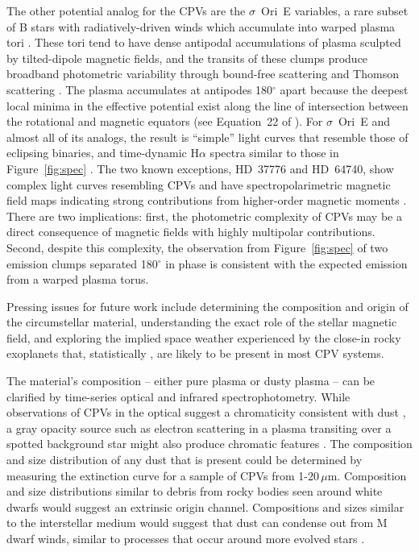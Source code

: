 \documentclass{nature3}
\begin{document}
The other potential analog for the CPVs are the $\sigma$~Ori~E
variables, a rare subset of B stars with radiatively-driven winds
which accumulate into warped plasma tori
\cite{Townsend2005,Townsend2008}.  These tori tend to have dense
antipodal accumulations of plasma sculpted by tilted-dipole magnetic
fields, and the transits of these clumps produce broadband photometric
variability through bound-free scattering \cite{Townsend2005} and
Thomson scattering \cite{Berry2022}.  The plasma accumulates at
antipodes 180$^\circ$ apart because the deepest local minima in the
effective potential exist along the line of intersection between the
rotational and magnetic equators (see Equation~22 of
\cite{Townsend2005}).  For $\sigma$~Ori~E and almost all of its
analogs, the result is ``simple'' light curves that resemble those of
eclipsing binaries, and time-dynamic H$\alpha$ spectra similar to
those in Figure~\ref{fig:spec} \cite{Townsend2005,Townsend2008}.  The
two known exceptions, HD~37776 and HD~64740, show complex light curves
resembling CPVs \cite{Mikulasek2020,Bouma2024} and have
spectropolarimetric magnetic field maps indicating strong
contributions from higher-order magnetic moments
\cite{Kochukhov2011,Shultz2018}.  There are two implications: first, the
photometric complexity of CPVs may be a direct consequence of magnetic
fields with highly multipolar contributions.  Second, despite this
complexity, the observation from Figure~\ref{fig:spec} of two emission
clumps separated 180$^\circ$ in phase is consistent with the expected
emission from a warped plasma torus.

Pressing issues for future work include determining the composition
and origin of the circumstellar material, understanding the exact role
of the stellar magnetic field, and exploring the implied space weather
experienced by the close-in rocky exoplanets that, statistically
\cite{Dressing2015}, are likely to be present in most CPV systems.

The material's composition -- either pure plasma or dusty plasma --
can be clarified by time-series optical and infrared
spectrophotometry.  While observations of CPVs in the optical suggest
a chromaticity consistent with dust
\cite{Tanimoto2020,Gunther2022,Koen2023}, a gray opacity source such
as electron scattering in a plasma transiting over a spotted
background star might also produce chromatic features
\cite{Rackham2018}.  The composition and size distribution of any dust
that is present could be determined by measuring the extinction curve
for a sample of CPVs from 1-20\,$\mu$m.  Composition and size
distributions similar to debris from rocky bodies seen around white
dwarfs \cite{Reach2009} would suggest an extrinsic origin channel.
Compositions and sizes similar to the interstellar medium would
suggest that dust can condense out from M dwarf winds, similar to
processes that occur around more evolved stars \cite{Marigo2008}.
\end{document}
